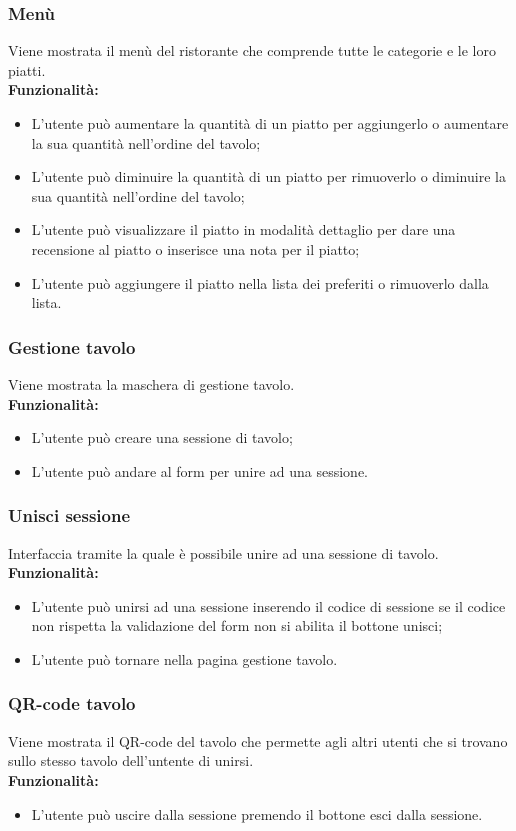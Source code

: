 \subsubsection{Menù}
Viene mostrata il menù del ristorante che comprende tutte le categorie e le loro piatti.\\
\textbf{Funzionalità:}
\begin{itemize}
    \item L'utente può aumentare la quantità di un piatto per aggiungerlo o aumentare la sua quantità nell'ordine del tavolo;
    \item L'utente può diminuire la quantità di un piatto per rimuoverlo o diminuire la sua quantità nell'ordine del tavolo;
    \item L'utente può visualizzare il piatto in modalità dettaglio per dare una recensione al piatto o inserisce una nota per il piatto;
    \item L'utente può aggiungere il piatto nella lista dei preferiti o rimuoverlo dalla lista.
\end{itemize}


\subsubsection{Gestione tavolo}
Viene mostrata la maschera di gestione tavolo.\\
\textbf{Funzionalità:}
\begin{itemize}
    \item L'utente può creare una sessione di tavolo;
    \item L'utente può andare al form per unire ad una sessione.
\end{itemize}


\subsubsection{Unisci sessione}
Interfaccia tramite la quale è possibile unire ad una sessione di tavolo.\\
\textbf{Funzionalità:}
\begin{itemize}
    \item L'utente può  unirsi ad una sessione inserendo il codice di sessione se il codice non rispetta la validazione del form non si abilita il bottone unisci;
    \item L'utente può tornare nella pagina gestione tavolo.
\end{itemize}


\subsubsection{QR-code tavolo}
Viene mostrata il QR-code del tavolo che permette agli altri utenti che si trovano sullo stesso tavolo dell'untente di unirsi.\\
\textbf{Funzionalità:}
\begin{itemize}
    \item L'utente può uscire dalla sessione premendo il bottone esci dalla sessione.
\end{itemize}


